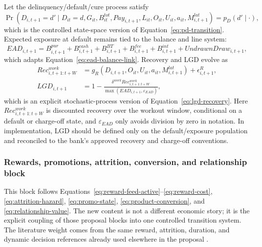 \documentclass[11pt]{article}
\newcommand{\1}{\mathbf{1}}
\begin{document}
Let the delinquency/default/cure process satisfy
\begin{equation}
  \Pr(D_{i,t+1}=d'\mid D_{it}=d,G_{it},B^{tot}_{it},Pay_{i,t+1},L_{it},O_{it},U_{it},a_{it},M^{lat}_{i,t+1})
  = p_D(d'\mid\cdot),
  \label{eq:ss-delinquency-transition}
\end{equation}
which is the controlled state-space version of Equation~\eqref{eq:pd-transition}.
Expected exposure at default remains tied to the balance and line system:
\begin{equation}
  EAD_{i,t+1}
  =
  B^{pur}_{i,t+1}+B^{cash}_{i,t+1}+B^{BT}_{i,t+1}+B^{fee}_{i,t+1}+B^{int}_{i,t+1}
  + UndrawnDraw_{i,t+1},
  \label{eq:ss-ead-identity}
\end{equation}
which adapts Equation~\eqref{eq:ead-balance-link}. Recovery and LGD evolve as
\begin{align}
  Rec^{work}_{i,t+1:t+W}
    &= g_R(D_{i,t+1},O_{it},U_{it},a_{it},M^{lat}_{i,t+1})
       + \epsilon^R_{i,t+1},
       \label{eq:ss-recovery-transition}\\
  LGD_{i,t+1}
    &=
    1-\frac{\delta^{work}Rec^{work}_{i,t+1:t+W}}
            {\max(EAD_{i,t+1},\varepsilon_{EAD})},
       \label{eq:ss-lgd-identity}
\end{align}
which is an explicit stochastic-process version of Equation~\eqref{eq:lgd-recovery}.
Here $Rec^{work}_{i,t+1:t+W}$ is discounted recovery over the workout window,
conditional on a default or charge-off state, and $\varepsilon_{EAD}$ only avoids
division by zero in notation. In implementation, LGD should be defined only on
the default/exposure population and reconciled to the bank's approved recovery
and charge-off conventions.

\subsubsection{Rewards, promotions, attrition, conversion, and relationship block}
\label{subsec:state-space-promo-attrition}

This block follows Equations~\eqref{eq:reward-feed-active}--\eqref{eq:reward-cost},
\eqref{eq:attrition-hazard}, \eqref{eq:promo-state},
\eqref{eq:product-conversion}, and \eqref{eq:relationship-value}. The new
content is not a different economic story; it is the explicit coupling of those
proposal blocks into one controlled transition system. The literature weight
comes from the same reward, attrition, duration, and dynamic decision references
already used elsewhere in the proposal
\citep{agarwal2010rewards,schmittlein1987counting,fader2005bgnbd,
bolton1998duration,puterman1994mdp,murphy2003dynamic}.
\end{document}
